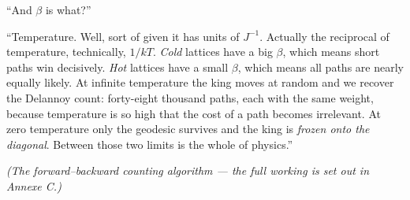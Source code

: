 ``And $\beta$ is what?''
 
``Temperature. Well, sort of given it has units of $J^{-1}$. Actually the reciprocal of temperature, technically, \(1/{kT}\).
\emph{Cold} lattices have a big $\beta$, which means short paths win
decisively. \emph{Hot} lattices have a small $\beta$, which means all paths are nearly equally likely. At infinite temperature the king moves at random and we recover the Delannoy count: forty-eight thousand paths, each with the same weight, because temperature is
so high that the cost of a path becomes irrelevant. At zero temperature only the geodesic survives and the king is \emph{frozen onto the diagonal}. Between those two limits is the whole of physics.''
 
\textit{(The forward–backward counting algorithm --- the full working is set out in Annexe C.)}


